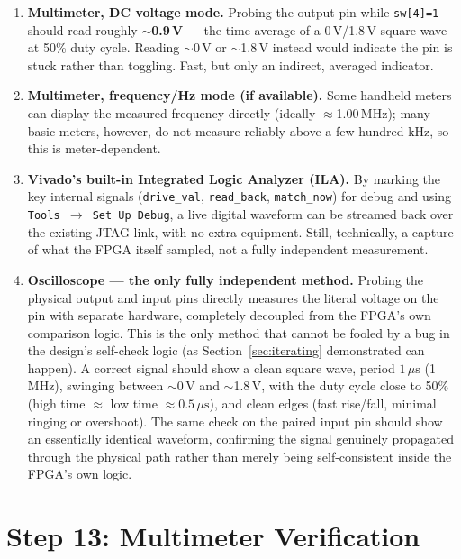 \documentclass[11pt]{article}
\begin{document}
\begin{enumerate}
    \item \textbf{Multimeter, DC voltage mode.} Probing the output pin while
    \texttt{sw[4]=1} should read roughly \textbf{$\sim$0.9\,V} --- the time-average of a
    0\,V/1.8\,V square wave at 50\% duty cycle. Reading $\sim$0\,V or $\sim$1.8\,V instead
    would indicate the pin is stuck rather than toggling. Fast, but only an indirect,
    averaged indicator.
    \item \textbf{Multimeter, frequency/Hz mode (if available).} Some handheld meters can
    display the measured frequency directly (ideally $\approx$1.00\,MHz); many basic
    meters, however, do not measure reliably above a few hundred kHz, so this is
    meter-dependent.
    \item \textbf{Vivado's built-in Integrated Logic Analyzer (ILA).} By marking the key
    internal signals (\texttt{drive\_val}, \texttt{read\_back}, \texttt{match\_now}) for
    debug and using \texttt{Tools $\to$ Set Up Debug}, a live digital waveform can be
    streamed back over the existing JTAG link, with no extra equipment. Still, technically,
    a capture of what the FPGA itself sampled, not a fully independent measurement.
    \item \textbf{Oscilloscope --- the only fully independent method.} Probing the
    physical output and input pins directly measures the literal voltage on the pin with
    separate hardware, completely decoupled from the FPGA's own comparison logic. This is
    the only method that cannot be fooled by a bug in the design's self-check logic
    (as Section~\ref{sec:iterating} demonstrated can happen). A correct signal should show a clean square
    wave, period $1\,\mu\text{s}$ (1\,MHz), swinging between $\sim$0\,V and $\sim$1.8\,V,
    with the duty cycle close to 50\% (high time $\approx$ low time $\approx 0.5\,\mu
    \text{s}$), and clean edges (fast rise/fall, minimal ringing or overshoot). The same
    check on the paired input pin should show an essentially identical waveform, confirming
    the signal genuinely propagated through the physical path rather than merely being
    self-consistent inside the FPGA's own logic.
\end{enumerate}

\section{Step 13: Multimeter Verification}
\label{sec:multimeter}
\end{document}
